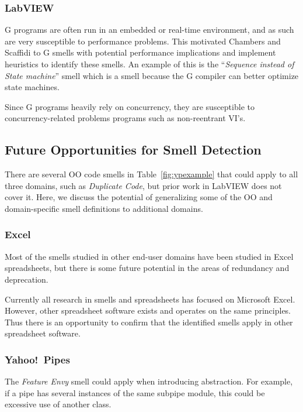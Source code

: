\documentclass[10pt,conference,compsocconf]{IEEEtran}
\begin{document}
\subsubsection{LabVIEW}

G programs are often run in an embedded or real-time environment, and as such are very susceptible to performance problems. This motivated Chambers and Scaffidi \cite{chambers2013smell} to G smells with potential performance implications and implement heuristics to identify these smells.
An example of this is the ``\textit{Sequence instead of State machine}'' smell which is a smell because the G compiler can better optimize state machines.

Since G programs heavily rely on concurrency, they are susceptible to  concurrency-related problems programs such as non-reentrant VI's.


\subsection{Future Opportunities for Smell Detection}
\label{subsec:futuresmells}
There are several OO code smells in Table~\ref{fig:ypexample} that could apply to all three domains, such as \emph{Duplicate Code}, but prior work in LabVIEW does not cover it. Here, we discuss the potential of generalizing some of the OO and domain-specific smell definitions to additional domains. 

\subsubsection{Excel}
Most of the smells studied in other end-user domains have been studied in Excel spreadsheets, but there is some future potential in the areas of redundancy and deprecation.

Currently all research in smells and spreadsheets has focused on Microsoft Excel.
However, other spreadsheet software exists and operates on the same principles.
Thus there is an opportunity to confirm that the identified smells apply in other spreadsheet software.

\subsubsection{Yahoo!\ Pipes}
\label{sec:smells:future:yp}
The \emph{Feature Envy} smell could  apply when introducing abstraction. For example, if a pipe has several instances of the same subpipe module, this could be excessive use of another class. 
\end{document}
